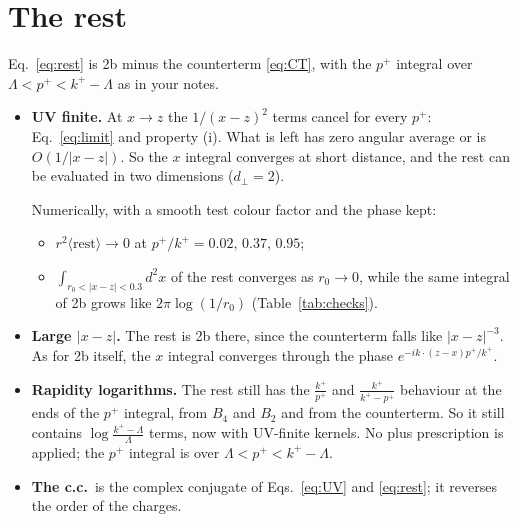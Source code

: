 \documentclass[10pt]{article}
\numberwithin{equation}{section}
\begin{document}
\section{The rest}\label{sec:rest}
Eq.~\eqref{eq:rest} is 2b minus the counterterm \eqref{eq:CT}, with the $p^+$ integral over $\Lambda<p^+<k^+-\Lambda$ as in your notes.
\begin{itemize}
\item \textbf{UV finite.} At $x\to z$ the $1/(x-z)^2$ terms cancel for every $p^+$: Eq.~\eqref{eq:limit} and property (i). What is left has zero angular average or is $O(1/|x-z|)$. So the $x$ integral converges at short distance, and the rest can be evaluated in two dimensions ($d_\perp=2$).

  Numerically, with a smooth test colour factor and the phase kept:
  \begin{itemize}
  \item $r^2\langle\text{rest}\rangle\to0$ at $p^+/k^+=0.02,\,0.37,\,0.95$;
  \item $\int_{r_0<|x-z|<0.3}d^2x$ of the rest converges as $r_0\to0$, while the same integral of 2b grows like $2\pi\log(1/r_0)$ (Table~\ref{tab:checks}).
  \end{itemize}
\item \textbf{Large $|x-z|$.} The rest is 2b there, since the counterterm falls like $|x-z|^{-3}$. As for 2b itself, the $x$ integral converges through the phase $e^{-ik\cdot(z-x)p^+/k^+}$.
\item \textbf{Rapidity logarithms.} The rest still has the $\frac{k^+}{p^+}$ and $\frac{k^+}{k^+-p^+}$ behaviour at the ends of the $p^+$ integral, from $B_4$ and $B_2$ and from the counterterm. So it still contains $\log\frac{k^+-\Lambda}{\Lambda}$ terms, now with UV-finite kernels. No plus prescription is applied; the $p^+$ integral is over $\Lambda<p^+<k^+-\Lambda$.
\item \textbf{The c.c.}\ is the complex conjugate of Eqs.~\eqref{eq:UV} and \eqref{eq:rest}; it reverses the order of the charges.
\end{itemize}

\end{document}

